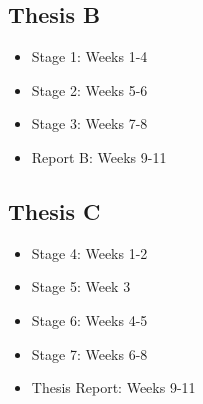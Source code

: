 \subsection{Thesis B}

\ssp\begin{itemize}
    \item Stage 1: Weeks 1-4
    \item Stage 2: Weeks 5-6
    \item Stage 3: Weeks 7-8
    \item Report B: Weeks 9-11
\end{itemize}\dsp

\subsection{Thesis C}

\ssp\begin{itemize}
    \item Stage 4: Weeks 1-2
    \item Stage 5: Week  3
    \item Stage 6: Weeks 4-5
    \item Stage 7: Weeks 6-8
    \item Thesis Report: Weeks 9-11
\end{itemize}\dsp